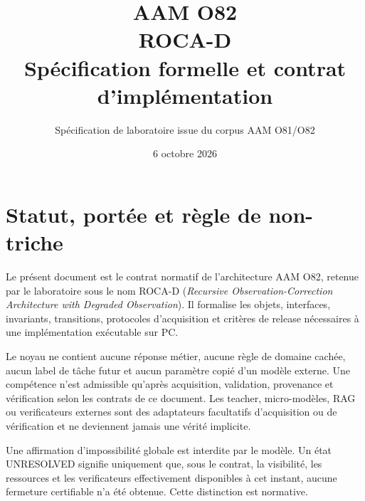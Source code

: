 \documentclass[11pt,a4paper]{report}
\title{AAM O82\\ROCA-D\\Spécification formelle et contrat d'implémentation}
\author{Spécification de laboratoire issue du corpus AAM O81/O82}
\date{6 octobre 2026}
\begin{document}
\setlength{\emergencystretch}{2em}
\maketitle
\tableofcontents

\chapter*{Statut, portée et règle de non-triche}
Le présent document est le contrat normatif de l'architecture AAM O82, retenue par le laboratoire sous le nom ROCA-D (\emph{Recursive Observation-Correction Architecture with Degraded Observation}). Il formalise les objets, interfaces, invariants, transitions, protocoles d'acquisition et critères de release nécessaires à une implémentation exécutable sur PC.

Le noyau ne contient aucune réponse métier, aucune règle de domaine cachée, aucun label de tâche futur et aucun paramètre copié d'un modèle externe. Une compétence n'est admissible qu'après acquisition, validation, provenance et vérification selon les contrats de ce document. Les teacher, micro-modèles, RAG ou verificateurs externes sont des adaptateurs facultatifs d'acquisition ou de vérification et ne deviennent jamais une vérité implicite.

Une affirmation d'impossibilité globale est interdite par le modèle. Un état UNRESOLVED signifie uniquement que, sous le contrat, la visibilité, les ressources et les verificateurs effectivement disponibles à cet instant, aucune fermeture certifiable n'a été obtenue. Cette distinction est normative.
\end{document}
